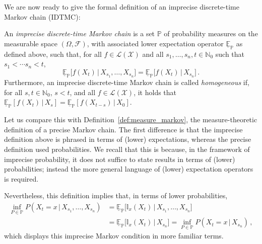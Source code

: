 \documentclass[graybox]{svmult}
\newcommand{\nats}{\mathbb{N}}
\newcommand{\natswith}{\nats_{0}}
\newcommand{\states}{\mathcal{X}}
\newcommand{\gambles}{\mathcal{L}}
\newcommand{\gamblesX}{\gambles(\states)}
\begin{document}
We are now ready to give the formal definition of an imprecise discrete-time Markov chain (IDTMC):
\begin{definition}\label{def:idtmc_set_measures}
An \emph{imprecise discrete-time Markov chain} is a set $\mathbb{P}$ of probability measures on the measurable space $(\Omega,\mathcal{F})$, with associated lower expectation operator $\underline{\mathbb{E}}_\mathbb{P}$ as defined above, such that, for all $f\in\gambles(\states)$ and all $s_1,\ldots,s_n,t\in\natswith$ such that $s_1<\cdots s_n<t$,
\begin{equation*}
\underline{\mathbb{E}}_\mathbb{P}\bigl[f(X_t)\,\big\vert\, X_{s_1},\ldots,X_{s_n}\bigr] = \underline{\mathbb{E}}_\mathbb{P}\bigl[f(X_t)\,\big\vert\, X_{s_n}\bigr]\,.
\end{equation*}
Furthermore, an imprecise discrete-time Markov chain is called \emph{homogeneous} if, for all $s,t\in\natswith$, $s<t$, and all $f\in\gamblesX$, it holds that $\underline{\mathbb{E}}_\mathbb{P}[f(X_t)\,\vert\,X_s]= \underline{\mathbb{E}}_\mathbb{P}[f(X_{t-s})\,\vert\,X_0]$.
\end{definition}
Let us compare this with Definition~\ref{def:measure_markov}, the measure-theoretic definition of a precise Markov chain. The first difference is that the imprecise definition above is phrased in terms of (lower) expectations, whereas the precise definition used probabilities. We recall that this is because, in the framework of imprecise probability, it does not suffice to state results in terms of (lower) probabilities; instead the more general language of (lower) expectation operators is required. %

Nevertheless, this definition implies that, in terms of lower probabilities,
\begin{align*}
\inf_{P\in\mathbb{P}} P(X_t=x\,\vert\,X_{s_1},\ldots,X_{s_n}) &= 
\underline{\mathbb{E}}_\mathbb{P}\bigl[\mathbb{I}_{x}(X_t)\,\big\vert\, X_{s_1},\ldots,X_{s_n}\bigr] \\
 &= \underline{\mathbb{E}}_\mathbb{P}\bigl[\mathbb{I}_{x}(X_t)\,\big\vert\, X_{s_n}\bigr]
= \inf_{P\in\mathbb{P}} P(X_t=x\,\vert\,X_{s_n})\,,
\end{align*}
which displays this imprecise Markov condition in more familiar terms.
\end{document}
